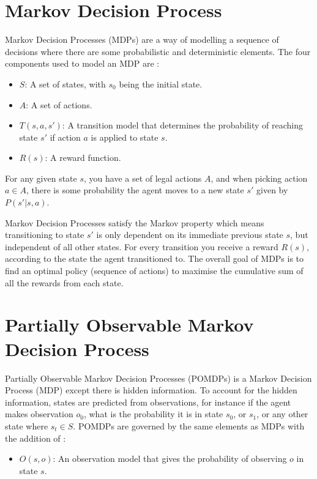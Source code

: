 \documentclass{bhamthesis}
\theoremstyle{definition}
\begin{document}
\section{Markov Decision Process}\label{s:mdp}
Markov Decision Processes (MDPs) are a way of modelling a sequence of decisions where there are some probabilistic and deterministic elements. The four components used to model an MDP are \cite{Russell2016}:

\begin{itemize}
	\item $S$: A set of states, with $s_0$ being the initial state.
	\item $A$: A set of actions.
	\item $T(s,a,s')$: A transition model that determines the probability of reaching state $s'$ if action $a$ is applied to state $s$.
	\item $R(s)$: A reward function.
\end{itemize}
For any given state $s$, you have a set of legal actions $A$, and when picking action $a \in A$, there is some probability the agent moves to a new state $s'$ given by $P(s'| s,a)$.

Markov Decision Processes satisfy the Markov property which means transitioning to state $s'$ is only dependent on its immediate previous state $s$, but independent of all other states. For every transition you receive a reward $R(s)$, according to the state the agent transitioned to. The overall goal of MDPs is to find an optimal policy (sequence of actions) to maximise the cumulative sum of all the rewards from each state.


\section{Partially Observable Markov Decision Process}\label{s:pomdb}
Partially Observable Markov Decision Processes (POMDPs) is a Markov Decision Process (MDP) except there is hidden information. To account for the hidden information, states are predicted from observations, for instance if the agent makes observation $o_0$, what is the probability it is in state $s_0$, or $s_1$, or any other state where $s_t \in S$. POMDPs are governed by the same elements as MDPs with the addition of \cite{Browne2012}:

\begin{itemize}
	\item $O(s,o)$: An observation model that gives the probability of observing $o$ in state $s$.
\end{itemize}
\end{document}
